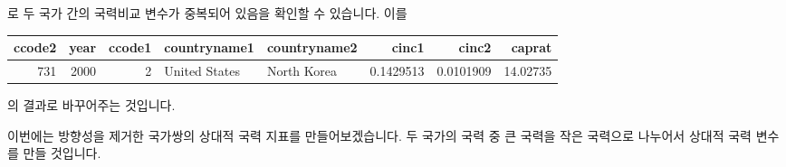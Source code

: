 \documentclass[]{book}
\newenvironment{Shaded}{\begin{snugshade}}{\end{snugshade}}
\newcommand{\DecValTok}[1]{\textcolor[rgb]{0.00,0.00,0.81}{#1}}
\newcommand{\KeywordTok}[1]{\textcolor[rgb]{0.13,0.29,0.53}{\textbf{#1}}}
\newcommand{\NormalTok}[1]{#1}
\newcommand{\OperatorTok}[1]{\textcolor[rgb]{0.81,0.36,0.00}{\textbf{#1}}}
\newcommand{\StringTok}[1]{\textcolor[rgb]{0.31,0.60,0.02}{#1}}
\begin{document}
로 두 국가 간의 국력비교 변수가 중복되어 있음을 확인할 수 있습니다. 이를

\begin{Shaded}
\end{Shaded}

\begin{tabular}{r|r|r|l|l|r|r|r}
\hline
ccode2 & year & ccode1 & countryname1 & countryname2 & cinc1 & cinc2 & caprat\\
\hline
731 & 2000 & 2 & United States & North Korea & 0.1429513 & 0.0101909 & 14.02735\\
\hline
\end{tabular}

의 결과로 바꾸어주는 것입니다.

\begin{Shaded}
\end{Shaded}

이번에는 방향성을 제거한 국가쌍의 상대적 국력 지표를 만들어보겠습니다. 두 국가의 국력 중 큰 국력을 작은 국력으로 나누어서 상대적 국력 변수를 만들 것입니다.

\begin{Shaded}
\end{Shaded}
\end{document}
